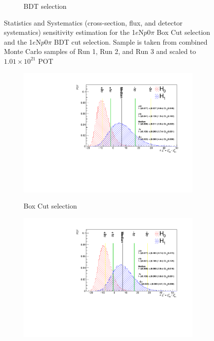 \documentclass[a4paper]{article}
\newcommand{\npsel}{1$e$N$p$0$\pi$\xspace}
\begin{document}
\begin{figure}[H]
\begin{center}
\begin{subfigure}[b]{0.48\textwidth}
    \label{fig:1eNp_bdt_syst}
    \caption{BDT selection}
    \end{subfigure}
\caption{\label{fig:1eNp:statsystsensitivity} Statistics and Systematics (cross-section, flux, and detector systematics) sensitivity estimation for the \npsel Box Cut selection and the \npsel BDT cut selection. Sample is taken from combined Monte Carlo samples of Run 1, Run 2, and Run 3 and scaled to $1.01\times10^21$ POT}
\end{center}
\end{figure}

\begin{figure}[H]
\begin{center}
    \begin{subfigure}[b]{0.48\textwidth}
    \centering
    \includegraphics[width=1.0\textwidth]{Sensitivity/BoxCut/SBNfit_Cls_nue_1e0p_numu_reco_e_H1_newboxcut_noCCMEC_constrained_detsys.pdf}
    \label{fig:1eNp_box_syst}
    \caption{Box Cut selection}
    \end{subfigure}
    \begin{subfigure}[b]{0.48\textwidth}
    \centering
    \includegraphics[width=1.0\textwidth]{Sensitivity/BDT_higheff/SBNfit_Cls_nue_1e0p_numu_reco_e_H1_newBDT_higheff_noCCMEC_constrained_detsys.pdf}

\end{subfigure}
\end{center}
\end{figure}
\end{document}
